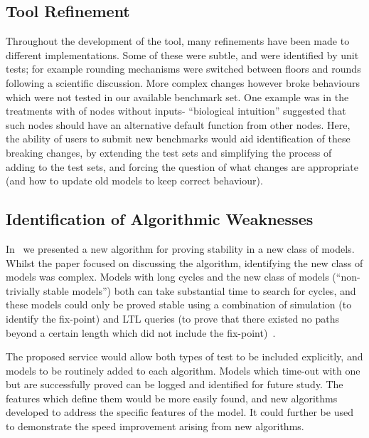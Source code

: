 \documentclass{llncs}
\begin{document}
\subsection{Tool Refinement}

Throughout the development of the tool, many refinements have been made 
to different implementations. Some of these were subtle, and were  
identified by unit tests; for example rounding mechanisms were switched
between floors and rounds following a scientific discussion. More complex
changes however broke behaviours which were not tested in our available 
benchmark set. One example was in the treatments with of nodes without
inputs- ``biological intuition'' suggested that such nodes should have
an alternative default function from other nodes. Here, the ability of 
users to submit new benchmarks would aid identification of these breaking
changes, by extending the test sets and simplifying the process of adding
to the test sets, and forcing the question of what changes are appropriate
(and how to update old models to keep correct behaviour).


\subsection{Identification of Algorithmic Weaknesses}

In~\cite{cook2014} we presented a new algorithm for proving stability in 
a new class of models. Whilst the paper focused on discussing the algorithm,
identifying the new class of models was complex. Models with long cycles 
and the new class of models (``non-trivially stable models'') both can take
substantial time to search for cycles, and these models could only be proved
stable using a combination of simulation (to identify the fix-point) and LTL
queries (to prove that there existed no paths beyond a certain length which 
did not include the fix-point)~\cite{piterman2013}. 

The proposed service would allow both types of test to be included explicitly,
and models to be routinely added to each algorithm. Models which time-out with 
one but are successfully proved can be logged and identified for future study.
The features which define them would be more easily found, and new algorithms
developed to address the specific features of the model. It could further be 
used to demonstrate the speed improvement arising from new algorithms.
\end{document}
